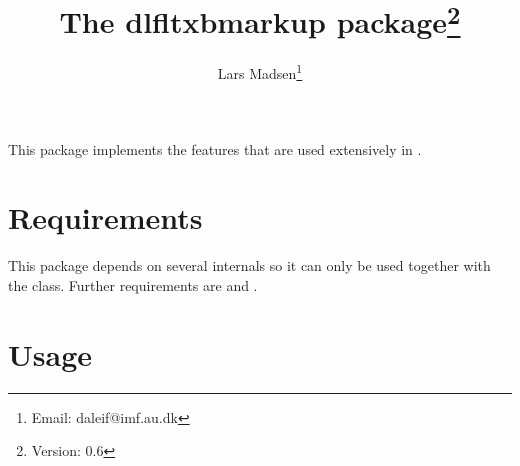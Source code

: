 \documentclass[11pt,oneside,a4paper,oldfontcommands,danish,english,article]{memoir}
\begin{document}
\title{The \textsf{dlfltxbmarkup} package\thanks{Version: 0.6}}
\author{Lars Madsen\thanks{Email: daleif@imf.au.dk}}
\maketitle

\noindent
This package implements the  features that are
used extensively in \cite{ltxb}.


\section{Requirements}
\label{sec:requirements}

This package depends on several  internals so
it can only be used together with the 
class. Further requirements are  and
. 


\section{Usage}
\label{sec:usage}
\end{document}
